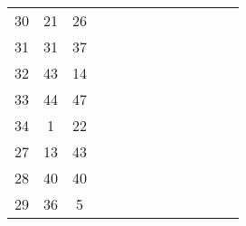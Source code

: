 \begin{table}[tb]
\begin{tabular}{|c|c|c|cccccccccc}
	30 & 21 & 26 &                         &                         &                         &                         &                        &                         &                         &                         &                        &                        \\ \cline{1-3}
	31 & 31 & 37 &                         &                         &                         &                         &                        &                         &                         &                         &                        &                        \\ \cline{1-3}
	32 & 43 & 14 &                         &                         &                         &                         &                        &                         &                         &                         &                        &                        \\ \cline{1-3}
	33 & 44 & 47 &                         &                         &                         &                         &                        &                         &                         &                         &                        &                        \\ \cline{1-3}
	34 & 1  & 22 &                         &                         &                         &                         &                        &                         &                         &                         &                        &                        \\ \cline{1-3}
	27 & 13 & 43 &                         &                         &                         &                         &                        &                         &                         &                         &                        &                        \\ \cline{1-3}
	28 & 40 & 40 &                         &                         &                         &                         &                        &                         &                         &                         &                        &                        \\ \cline{1-3}
	29 & 36 & 5  &                         &                         &                         &                         &                        &                         &                         &                         &                        &                        \\ \cline{1-3}

\end{tabular}
\end{table}
